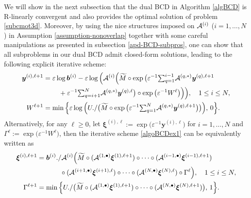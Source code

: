 \documentclass[10pt]{article}
\newcommand{\cA}{{\cal A}}
\begin{document}
We will show in the next subsection that the dual BCD in Algorithm \ref{algBCD}
is R-linearly convergent and also provides the optimal solution of problem \eqref{subcmot3d}.
Moreover, by using the nice structures imposed on $\cA^{(i)}$ ($i=1,\dots,N$) in Assumption \ref{assumption-nonoverlap} together with some careful manipulations as presented in subsection \ref{apd-BCD-subpros}, one can show that all subproblems in our dual BCD admit closed-form solutions, leading to the following explicit iterative scheme:
\begin{equation}\label{algoBCDex1}
\begin{aligned}
\bm{y}^{(i),\ell+1}
& = \varepsilon \log \bm{b}^{(i)} - \varepsilon\log \Big( \cA^{(i)}\Big( \widetilde{M} \circ \exp \big( \varepsilon^{-1}\mbox{$\sum_{q=1}^{i-1} $} \cA^{(q,*)}\bm{y}^{(q),\ell+1} \\
&\hspace{0.8cm} + \varepsilon^{-1}\mbox{$\sum_{q=i+1}^{N} $} \cA^{(q,*)}\bm{y}^{(q),\ell}\big) \circ \exp\big (\varepsilon^{-1}W^\ell \big) \Big) \Big),\quad 1\leq i \leq N,\\
W^{\ell+1} & = \min\Big\{ \varepsilon\log\Big( U./\big(\widetilde{M}\circ \exp\big(\varepsilon^{-1}{\textstyle\sum_{q=1}^{N}}\cA^{(q,*)}\bm{y}^{(q),\ell+1}\big) \big) \Big),\,0   \Big\}.
\end{aligned}
\end{equation}
Alternatively, for any $\ell\geq0$, let $\bm{\xi}^{(i),\ell} := \exp\big( \varepsilon^{-1}\bm{y}^{(i),\ell} \big)$ for $i=1,\ldots,N$ and $\Gamma^\ell := \exp\big(  \varepsilon^{-1}W^\ell \big)$, then the iterative scheme \eqref{algoBCDex1} can be equivalently written as
\begin{equation}\label{algoBCDex2}
\begin{aligned}
\bm{\xi}^{(i),\ell+1} &= \bm{b}^{(i)}./ \cA^{(i)}\Big( \widetilde{M}\circ (\cA^{(1,\bullet)}\bm{\xi}^{(1),\ell+1})\circ\dots \circ (\cA^{(i-1,\bullet)}\bm{\xi}^{(i-1),\ell+1}) \\
&\hspace{1.2cm} \circ (\cA^{(i+1,\bullet)}\bm{\xi}^{(i+1),\ell}) \circ \dots \circ (\cA^{(N,\bullet)}\bm{\xi}^{(N),\ell})\circ \Gamma^\ell \Big),\quad 1\leq i\leq N,\\
\Gamma^{\ell+1} & = \min\Big\{ U./\big( \widetilde{M}\circ (\cA^{(1,\bullet)}\bm{\xi}^{(1),\ell+1})\circ\dots \circ (\cA^{(N,\bullet)}\bm{\xi}^{(N),\ell+1}) \big),\,1 \Big\}.
\end{aligned}
\end{equation}
\end{document}
